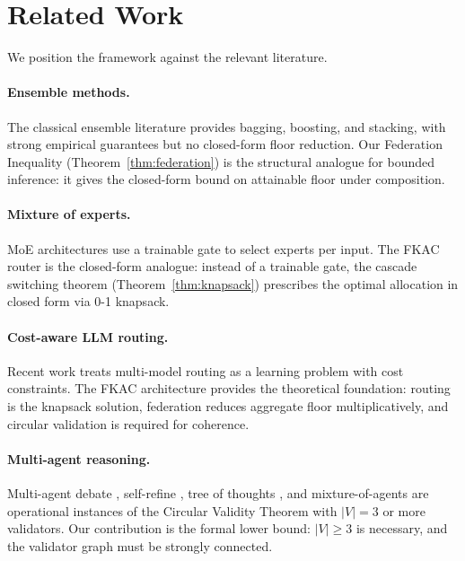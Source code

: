 \documentclass[11pt,twocolumn,a4paper]{article}
\theoremstyle{definition}
\theoremstyle{remark}
\begin{document}
\section{Related Work}
\label{sec:related}

We position the framework against the relevant literature.

\paragraph{Ensemble methods.} The classical ensemble literature \citep{dietterich2000ensemble,breiman2001random,freund1997decision,schapire1990strength,wolpert1992stacked} provides bagging, boosting, and stacking, with strong empirical guarantees but no closed-form floor reduction. Our Federation Inequality (Theorem~\ref{thm:federation}) is the structural analogue for bounded inference: it gives the closed-form bound on attainable floor under composition.

\paragraph{Mixture of experts.} MoE architectures \citep{jacobs1991adaptive,shazeer2017outrageously,fedus2022switch} use a trainable gate to select experts per input. The FKAC router is the closed-form analogue: instead of a trainable gate, the cascade switching theorem (Theorem~\ref{thm:knapsack}) prescribes the optimal allocation in closed form via 0-1 knapsack.

\paragraph{Cost-aware LLM routing.} Recent work \citep{chen2023frugalgpt,sakota2024fly,lu2024merge,ong2024routellm,liu2024routerbench,aggarwal2024automix,naik2024diversity,stoica2024specialized} treats multi-model routing as a learning problem with cost constraints. The FKAC architecture provides the theoretical foundation: routing is the knapsack solution, federation reduces aggregate floor multiplicatively, and circular validation is required for coherence.

\paragraph{Multi-agent reasoning.} Multi-agent debate \citep{du2023improving}, self-refine \citep{madaan2023self}, tree of thoughts \citep{yao2023tree}, and mixture-of-agents \citep{wang2024mixture} are operational instances of the Circular Validity Theorem with $|V| = 3$ or more validators. Our contribution is the formal lower bound: $|V| \geq 3$ is necessary, and the validator graph must be strongly connected.
\end{document}
